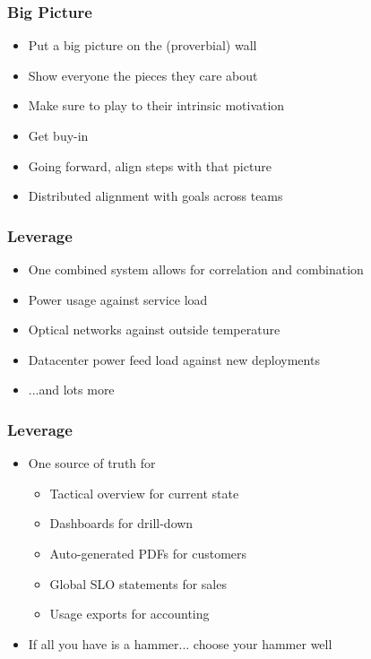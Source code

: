 \documentclass[t]{beamer}
\begin{document}
\begin{frame}
	\frametitle{Big Picture}
	\begin{itemize}
		\item Put a big picture on the (proverbial) wall
		\item Show everyone the pieces they care about
		\item Make sure to play to their intrinsic motivation
		\item Get buy-in
		\item Going forward, align steps with that picture
		\item Distributed alignment with goals across teams
	\end{itemize}
\end{frame}

\begin{frame}
	\frametitle{Leverage}
	\begin{itemize}
		\item One combined system allows for correlation and combination
		\item Power usage against service load
		\item Optical networks against outside temperature
		\item Datacenter power feed load against new deployments
		\item ...and lots more
	\end{itemize}
\end{frame}

\begin{frame}
	\frametitle{Leverage}
	\begin{itemize}
		\item One source of truth for
		\begin{itemize}
			\item Tactical overview for current state
			\item Dashboards for drill-down
			\item Auto-generated PDFs for customers
			\item Global SLO statements for sales
			\item Usage exports for accounting
		\end{itemize}
	\item If all you have is a hammer... choose your hammer well
	\end{itemize}
\end{frame}
\end{document}
